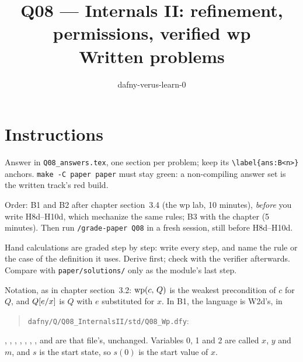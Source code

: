 \documentclass[11pt]{article}
\title{Q08 --- Internals II: refinement, permissions, verified wp \\ \large Written problems}
\author{dafny-verus-learn-0}
\date{}
\begin{document}
\maketitle

\section*{Instructions}
Answer in \texttt{Q08\_answers.tex}, one section per problem; keep its
\verb+\label{ans:B<n>}+ anchors. \texttt{make -C paper paper} must stay green:
a non-compiling answer set is the written track's red build.

Order: B1 and B2 after chapter section~3.4 (the wp lab, 10 minutes),
\emph{before} you write H8d--H10d, which mechanize the same rules; B3 with the
chapter (5 minutes). Then run \texttt{/grade-paper Q08} in a fresh session,
still before H8d--H10d.

Hand calculations are graded step by step: write every step, and name the rule
or the case of the definition it uses. Derive first; check with the verifier
afterwards. Compare with \texttt{paper/solutions/} only as the module's last
step.

Notation, as in chapter section~3.2: $\WP{c}{Q}$ is the weakest precondition of
$c$ for $Q$, and $\subst{Q}{x}{e}$ is $Q$ with $e$ substituted for $x$. In B1,
the language is W2d's, in
\begin{quote}
\texttt{dafny/Q/Q08\_InternalsII/std/Q08\_Wp.dfy}:
\end{quote}
\noindent {}, , , , , ,
,  and  are that file's, unchanged. Variables
0, 1 and 2 are called $x$, $y$ and $m$, and $s$ is the start state, so $s(0)$
is the start value of $x$.
\end{document}
